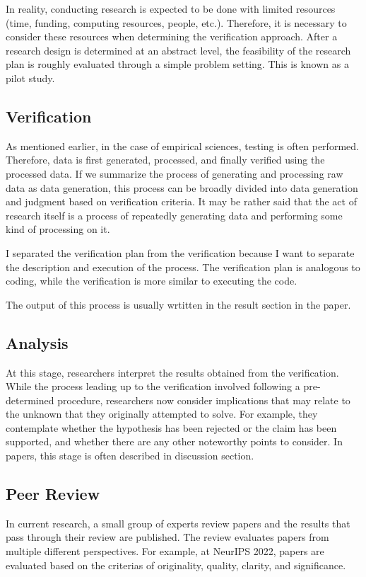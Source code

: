 \documentclass{book}
\begin{document}
In reality, conducting research is expected to be done with limited resources (time, funding, computing resources, people, etc.). Therefore, it is necessary to consider these resources when determining the verification approach. After a research design is determined at an abstract level, the feasibility of the research plan is roughly evaluated through a simple problem setting. This is known as a pilot study.
\subsection{Verification}

As mentioned earlier, in the case of empirical sciences, testing is often performed. Therefore, data is first generated, processed, and finally verified using the processed data. If we summarize the process of generating and processing raw data as data generation, this process can be broadly divided into data generation and judgment based on verification criteria. It may be rather said that the act of research itself is a process of repeatedly generating data and performing some kind of processing on it.

I separated the verification plan from the verification because I want to separate the description and execution of the process. The verification plan is analogous to coding, while the verification is more similar to executing the code.

The output of this process is usually wrtitten in the result section in the paper.

\subsection{Analysis}
At this stage, researchers interpret the results obtained from the verification. While the process leading up to the verification involved following a pre-determined procedure, researchers now consider implications that may relate to the unknown that they originally attempted to solve. For example, they contemplate whether the hypothesis has been rejected or the claim has been supported, and whether there are any other noteworthy points to consider. In papers, this stage is often described in discussion section.

\subsection{Peer Review}
In current research, a small group of experts review papers and the results that pass through their review are published. The review evaluates papers from multiple different perspectives. For example, at NeurIPS 2022, papers are evaluated based on the criterias of originality, quality, clarity, and significance.
\end{document}
